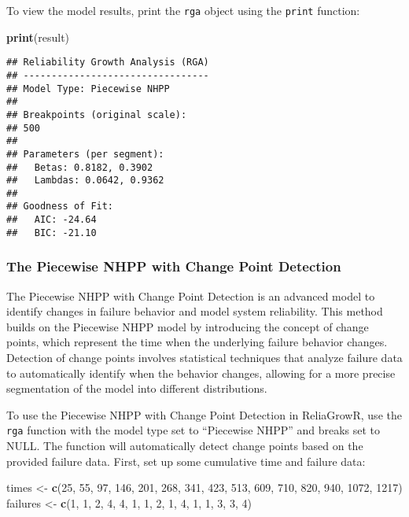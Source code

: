 \documentclass[
]{article}
\newenvironment{Shaded}{\begin{snugshade}}{\end{snugshade}}
\newcommand{\DecValTok}[1]{\textcolor[rgb]{0.00,0.00,0.81}{#1}}
\newcommand{\FunctionTok}[1]{\textcolor[rgb]{0.13,0.29,0.53}{\textbf{#1}}}
\newcommand{\NormalTok}[1]{#1}
\newcommand{\OtherTok}[1]{\textcolor[rgb]{0.56,0.35,0.01}{#1}}
\begin{document}
To view the model results, print the \texttt{rga} object using the
\texttt{print} function:

\begin{Shaded}
\begin{Highlighting}[]
\FunctionTok{print}\NormalTok{(result)}
\end{Highlighting}
\end{Shaded}

\begin{verbatim}
## Reliability Growth Analysis (RGA)
## ---------------------------------
## Model Type: Piecewise NHPP 
## 
## Breakpoints (original scale):
## 500 
## 
## Parameters (per segment):
##   Betas: 0.8182, 0.3902
##   Lambdas: 0.0642, 0.9362
## 
## Goodness of Fit:
##   AIC: -24.64
##   BIC: -21.10
\end{verbatim}

\subsubsection{The Piecewise NHPP with Change Point
Detection}\label{the-piecewise-nhpp-with-change-point-detection}

The Piecewise NHPP with Change Point Detection is an advanced model to
identify changes in failure behavior and model system reliability. This
method builds on the Piecewise NHPP model by introducing the concept of
change points, which represent the time when the underlying failure
behavior changes. Detection of change points involves statistical
techniques that analyze failure data to automatically identify when the
behavior changes, allowing for a more precise segmentation of the model
into different distributions.

To use the Piecewise NHPP with Change Point Detection in ReliaGrowR, use
the \texttt{rga} function with the model type set to ``Piecewise NHPP''
and breaks set to NULL. The function will automatically detect change
points based on the provided failure data. First, set up some cumulative
time and failure data:

\begin{Shaded}
\begin{Highlighting}[]
\NormalTok{times }\OtherTok{\textless{}{-}} \FunctionTok{c}\NormalTok{(}\DecValTok{25}\NormalTok{, }\DecValTok{55}\NormalTok{, }\DecValTok{97}\NormalTok{, }\DecValTok{146}\NormalTok{, }\DecValTok{201}\NormalTok{, }\DecValTok{268}\NormalTok{, }\DecValTok{341}\NormalTok{, }\DecValTok{423}\NormalTok{, }\DecValTok{513}\NormalTok{, }\DecValTok{609}\NormalTok{, }\DecValTok{710}\NormalTok{, }\DecValTok{820}\NormalTok{, }\DecValTok{940}\NormalTok{, }\DecValTok{1072}\NormalTok{, }\DecValTok{1217}\NormalTok{)}
\NormalTok{failures }\OtherTok{\textless{}{-}} \FunctionTok{c}\NormalTok{(}\DecValTok{1}\NormalTok{, }\DecValTok{1}\NormalTok{, }\DecValTok{2}\NormalTok{, }\DecValTok{4}\NormalTok{, }\DecValTok{4}\NormalTok{, }\DecValTok{1}\NormalTok{, }\DecValTok{1}\NormalTok{, }\DecValTok{2}\NormalTok{, }\DecValTok{1}\NormalTok{, }\DecValTok{4}\NormalTok{, }\DecValTok{1}\NormalTok{, }\DecValTok{1}\NormalTok{, }\DecValTok{3}\NormalTok{, }\DecValTok{3}\NormalTok{, }\DecValTok{4}\NormalTok{)}
\end{Highlighting}
\end{Shaded}
\end{document}
